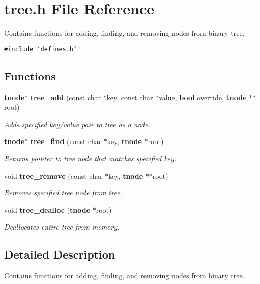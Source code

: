 \section{tree.h File Reference}
\label{tree_8h}
Contains functions for adding, finding, and removing nodes from binary tree. 


{\tt \#include \char`\"{}defines.h\char`\"{}}\par
\subsection*{Functions}
\begin{CompactItemize}
\item 
{\bf tnode}$\ast$ {\bf tree\_\-add} (const char $\ast$key, const char $\ast$value, {\bf bool} override, {\bf tnode} $\ast$$\ast$root)
\begin{CompactList}\small\item\em Adds specified key/value pair to tree as a node.\item\end{CompactList}\item 
{\bf tnode}$\ast$ {\bf tree\_\-find} (const char $\ast$key, {\bf tnode} $\ast$root)
\begin{CompactList}\small\item\em Returns pointer to tree node that matches specified key.\item\end{CompactList}\item 
void {\bf tree\_\-remove} (const char $\ast$key, {\bf tnode} $\ast$$\ast$root)
\begin{CompactList}\small\item\em Removes specified tree node from tree.\item\end{CompactList}\item 
void {\bf tree\_\-dealloc} ({\bf tnode} $\ast$root)
\begin{CompactList}\small\item\em Deallocates entire tree from memory.\item\end{CompactList}\end{CompactItemize}


\subsection{Detailed Description}
Contains functions for adding, finding, and removing nodes from binary tree.




